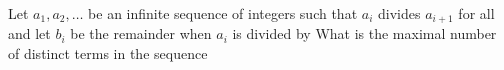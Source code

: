 Let $a_1,a_2,\ldots$ be an infinite sequence of integers such that $a_i$ divides $a_{i+1}$ for all  and let $b_i$ be the remainder when $a_i$ is divided by   What is the maximal number of distinct terms in the sequence 